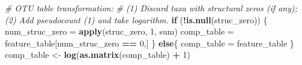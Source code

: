 \documentclass[
]{book}
\newenvironment{Shaded}{\begin{snugshade}}{\end{snugshade}}
\newcommand{\CommentTok}[1]{\textcolor[rgb]{0.56,0.35,0.01}{\textit{#1}}}
\newcommand{\ControlFlowTok}[1]{\textcolor[rgb]{0.13,0.29,0.53}{\textbf{#1}}}
\newcommand{\DecValTok}[1]{\textcolor[rgb]{0.00,0.00,0.81}{#1}}
\newcommand{\KeywordTok}[1]{\textcolor[rgb]{0.13,0.29,0.53}{\textbf{#1}}}
\newcommand{\NormalTok}[1]{#1}
\newcommand{\OperatorTok}[1]{\textcolor[rgb]{0.81,0.36,0.00}{\textbf{#1}}}
\newcommand{\StringTok}[1]{\textcolor[rgb]{0.31,0.60,0.02}{#1}}
\begin{document}
\begin{Shaded}
\begin{Highlighting}[]
    \CommentTok{\# OTU table transformation:}
    \CommentTok{\# (1) Discard taxa with structural zeros (if any); (2) Add pseudocount (1) and take logarithm.}
    \ControlFlowTok{if}\NormalTok{ (}\OperatorTok{!}\KeywordTok{is.null}\NormalTok{(struc\_zero)) \{}
\NormalTok{        num\_struc\_zero =}\StringTok{ }\KeywordTok{apply}\NormalTok{(struc\_zero, }\DecValTok{1}\NormalTok{, sum)}
\NormalTok{        comp\_table =}\StringTok{ }\NormalTok{feature\_table[num\_struc\_zero }\OperatorTok{==}\StringTok{ }\DecValTok{0}\NormalTok{,]}
\NormalTok{    \} }\ControlFlowTok{else}\NormalTok{\{}
\NormalTok{        comp\_table =}\StringTok{ }\NormalTok{feature\_table}
\NormalTok{    \}}
\NormalTok{    comp\_table \textless{}{-}}\StringTok{ }\KeywordTok{log}\NormalTok{(}\KeywordTok{as.matrix}\NormalTok{(comp\_table) }\OperatorTok{+}\StringTok{ }\DecValTok{1}\NormalTok{)}
    

\end{Highlighting}
\end{Shaded}
\end{document}
